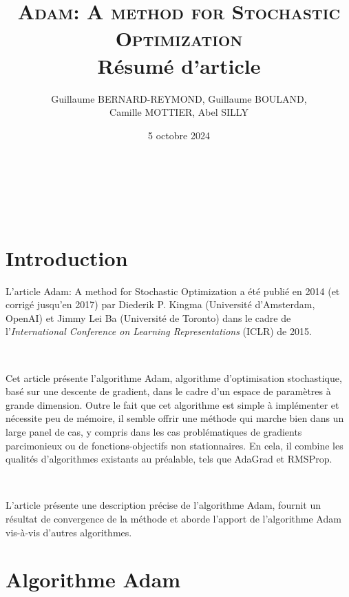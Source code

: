 \documentclass[11pt,a4paper, french]{article}
\title{\textsc{Adam: A method for Stochastic Optimization}\\
Résumé d'article}
\author{Guillaume BERNARD-REYMOND, Guillaume BOULAND,\\ Camille MOTTIER, Abel SILLY}
\date{5 octobre 2024}
\begin{document}
\maketitle

\


\vspace{1cm}  %
\tableofcontents
\vspace{1cm} 

\


\section{Introduction}

L'article \og Adam: A method for Stochastic Optimization \cite{kingma2017adammethodstochasticoptimization}\fg{} a été publié en 2014 (et corrigé jusqu'en 2017) par Diederik P. Kingma (Université d'Amsterdam, OpenAI) et Jimmy Lei Ba (Université de Toronto) dans le cadre de l'\textit{International Conference on Learning Representations} (ICLR) de 2015. 

\

Cet article présente l'algorithme Adam, algorithme d'optimisation stochastique, basé sur une descente de gradient, dans le cadre d'un espace de paramètres à grande dimension.
Outre le fait que cet algorithme est simple à implémenter et nécessite peu de mémoire, il semble offrir une méthode qui marche bien dans un large panel de cas, y compris dans les cas problématiques de gradients parcimonieux ou de fonctions-objectifs non stationnaires. En cela, il combine les qualités d'algorithmes existants au préalable, tels que AdaGrad et RMSProp.

\

L'article présente une description précise de l'algorithme Adam, fournit un résultat de convergence de la méthode et aborde l'apport de l'algorithme Adam vis-à-vis d'autres algorithmes. 



\section{Algorithme Adam}
\end{document}
